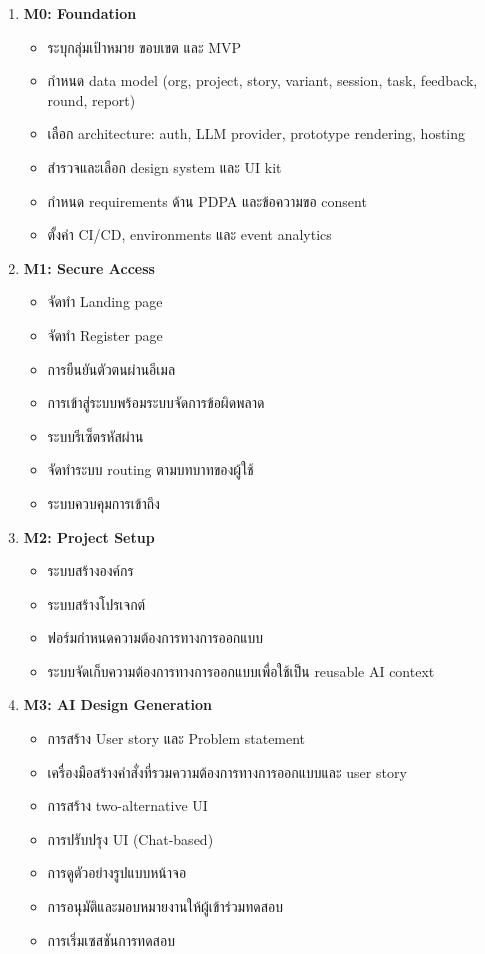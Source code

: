 \begin{enumerate}
  \item \textbf{M0: Foundation}
    \begin{itemize}
      \item ระบุกลุ่มเป้าหมาย ขอบเขต และ MVP
      \item กำหนด data model (org, project, story, variant, session, task, feedback, round, report)
      \item เลือก architecture: auth, LLM provider, prototype rendering, hosting
      \item สำรวจและเลือก design system และ UI kit
      \item กำหนด requirements ด้าน PDPA และข้อความขอ consent
      \item ตั้งค่า CI/CD, environments และ event analytics
    \end{itemize}

  \item \textbf{M1: Secure Access}
    \begin{itemize}
      \item จัดทำ Landing page
      \item จัดทำ Register page
      \item การยืนยันตัวตนผ่านอีเมล
      \item การเข้าสู่ระบบพร้อมระบบจัดการข้อผิดพลาด
      \item ระบบรีเซ็ตรหัสผ่าน
      \item จัดทำระบบ routing ตามบทบาทของผู้ใช้
      \item ระบบควบคุมการเข้าถึง
    \end{itemize}

  \item \textbf{M2: Project Setup}
    \begin{itemize}
      \item ระบบสร้างองค์กร
      \item ระบบสร้างโปรเจกต์
      \item ฟอร์มกำหนดความต้องการทางการออกแบบ
      \item ระบบจัดเก็บความต้องการทางการออกแบบเพื่อใช้เป็น reusable AI context
    \end{itemize}

  \item \textbf{M3: AI Design Generation}
    \begin{itemize}
      \item การสร้าง User story และ Problem statement
      \item เครื่องมือสร้างคำสั่งที่รวมความต้องการทางการออกแบบและ user story
      \item การสร้าง two-alternative UI
      \item การปรับปรุง UI (Chat-based)
      \item การดูตัวอย่างรูปแบบหน้าจอ
      \item การอนุมัติและมอบหมายงานให้ผู้เข้าร่วมทดสอบ
      \item การเริ่มเซสชันการทดสอบ
    \end{itemize}


\end{enumerate}
